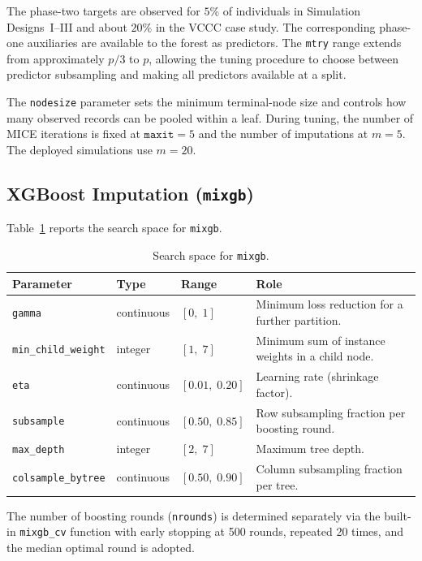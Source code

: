 The phase-two targets are observed for $5\%$ of individuals in Simulation Designs~I--III and about $20\%$ in the VCCC case study. The corresponding phase-one auxiliaries are available to the forest as predictors. The \texttt{mtry} range extends from approximately $p/3$ to $p$, allowing the tuning procedure to choose between predictor subsampling and making all predictors available at a split.

The \texttt{nodesize} parameter sets the minimum terminal-node size and controls how many observed records can be pooled within a leaf. During tuning, the number of MICE iterations is fixed at $\texttt{maxit}=5$ and the number of imputations at $m=5$. The deployed simulations use $m=20$.

\subsection{XGBoost Imputation (\texttt{mixgb})}

Table~\ref{tab:tune_mixgb} reports the search space for \texttt{mixgb}.

\begin{table}[ht]
\centering
\caption{Search space for \texttt{mixgb}.}
\label{tab:tune_mixgb}
\begin{tabularx}{\textwidth}{lll>{\raggedright\arraybackslash}X}
\toprule
Parameter & Type & Range & Role \\
\midrule
\texttt{gamma} & continuous & $[0,\; 1]$ &
    Minimum loss reduction for a further partition. \\
\texttt{min\_child\_weight} & integer & $[1,\; 7]$ &
    Minimum sum of instance weights in a child node. \\
\texttt{eta} & continuous & $[0.01,\; 0.20]$ &
    Learning rate (shrinkage factor). \\
\texttt{subsample} & continuous & $[0.50,\; 0.85]$ &
    Row subsampling fraction per boosting round. \\
\texttt{max\_depth} & integer & $[2,\; 7]$ &
    Maximum tree depth. \\
\texttt{colsample\_bytree} & continuous & $[0.50,\; 0.90]$ &
    Column subsampling fraction per tree. \\
\bottomrule
\end{tabularx}
\end{table}

The number of boosting rounds (\texttt{nrounds}) is determined separately via the built-in \texttt{mixgb\_cv} function with early stopping at 500 rounds, repeated 20 times, and the median optimal round is adopted.

